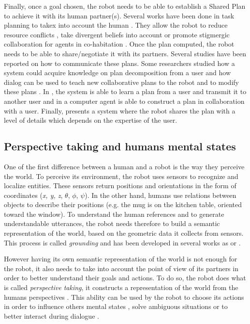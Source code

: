 \documentclass[english,a4paper,11pt,twoside]{StyleThese}
\begin{document}
Finally, once a goal chosen, the robot needs to be able to establish a Shared Plan to achieve it with its human partner(s). Several works have been done in task planning to takex into account the human \cite{cirillo2010human,Lallement2014hatp}. They allow the robot to reduce resource conflicts \cite{chakraborti2016planning}, take divergent beliefs into account \cite{guitton2012belief,talamadupula2014coordination} or promote stigmergic collaboration
for agents in co-habitation \cite{chakraborti2015planning}. 
Once the plan computed, the robot needs to be able to share/negotiate it with its partners. Several studies have been reported on how to communicate these plans. Some researchers studied how a system could acquire knowledge on plan decomposition from a user \cite{Mohseni2015} and how dialog can be used to teach new collaborative plans to the robot and to modify these plans \cite{petit2013coordinating}. In \cite{sorce2015proof}, the system is able to learn a plan from a user and transmit it to another user and in \cite{allen2002human} a computer agent is able to construct a plan in collaboration with a user. Finally, \cite{milliez2016using} presents a system where the robot shares the plan with a level of details which depends on the expertise of the user.

\subsection{Perspective taking and humans mental states}

\label{subsec:perspective_taking}

One of the first difference between a human and a robot is the way they perceive the world. To perceive its environment, the robot uses sensors to recognize and localize entities. These sensors return positions and orientations in the form of coordinates (\textit{x, y, z}, $\theta$, $\phi$, $\psi$). In the other hand, humans use relations between objects to describe their positions (e.g. the mug is on the kitchen table, oriented toward the window). To understand the human references and to
generate understandable utterances, the robot needs therefore
to build a semantic representation of the world, based on the
geometric data it collects from sensors. This process is called \textit{grounding} and has been developed in several works as \cite{mavridis2005grounded} or \cite{lemaignan2012grounding}.

However having its own semantic representation of the world is not enough for the robot, it also needs to take into account the point of view of its partners in order to better understand their goals and actions. To do so, the robot does what is called \textit{perspective taking}, it constructs a representation of the world from the humans perspectives \cite{breazeal2006using,milliez2014framework}. This ability can be used by the robot to choose its actions in order to influence others mental states \cite{gray2014manipulating}, solve ambiguous situations \cite{ros2010one} or to better interact during dialogue \cite{ferreira2015users}.
\end{document}

